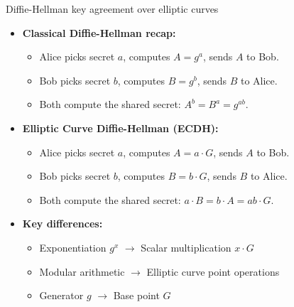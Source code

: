 \ifdefined\PRESENTATION\else\PassOptionsToClass{handout}{beamer}\fi\documentclass[aspectratio=169, lualatex]{beamer}
\begin{document}
\begin{frame}{Diffie-Hellman key agreement over elliptic curves}
	\begin{itemize}
		\item \textbf{Classical Diffie-Hellman recap:}
		      \begin{itemize}
			      \item Alice picks secret $a$, computes $A = g^a$, sends $A$ to Bob.
			      \item Bob picks secret $b$, computes $B = g^b$, sends $B$ to Alice.
			      \item Both compute the shared secret: $A^b = B^a = g^{ab}$.
		      \end{itemize}
		\item \textbf{Elliptic Curve Diffie-Hellman (ECDH):}
		      \begin{itemize}
			      \item Alice picks secret $a$, computes $A = a \cdot G$, sends $A$ to Bob.
			      \item Bob picks secret $b$, computes $B = b \cdot G$, sends $B$ to Alice.
			      \item Both compute the shared secret: $a \cdot B = b \cdot A = ab \cdot G$.
		      \end{itemize}
		\item \textbf{Key differences:}
		      \begin{itemize}
			      \item Exponentiation $g^x$ $\rightarrow$ Scalar multiplication $x \cdot G$
			      \item Modular arithmetic $\rightarrow$ Elliptic curve point operations
			      \item Generator $g$ $\rightarrow$ Base point $G$
		      \end{itemize}
	\end{itemize}
\end{frame}
\end{document}
